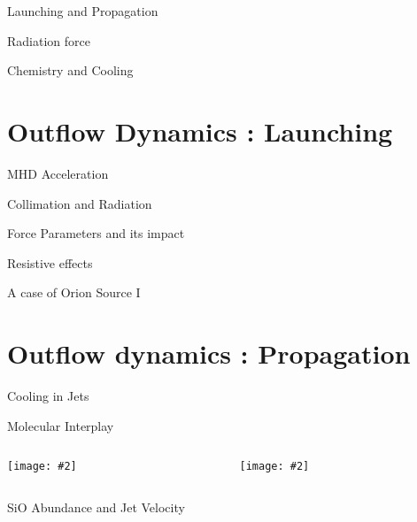 \documentclass[8pt,xcolor=dvipsnames]{beamer}
\newcommand{\figpath}{./NEWFIGS/}
\newcommand{\spic}[2]{\texttt{[image: \#2]}}
\begin{document}
\begin{frame}{Launching and Propagation}
\end{frame}

\begin{frame}{Radiation force}
\end{frame}

\begin{frame}{Chemistry and Cooling}
\end{frame}

\section{Outflow Dynamics : Launching}
\begin{frame}{MHD Acceleration}
\end{frame}

\begin{frame}{Collimation and Radiation}
\end{frame}

\begin{frame}{Force Parameters and its impact}
\end{frame}

\begin{frame}{Resistive effects}
\end{frame}

\begin{frame}{A case of Orion Source I}
\end{frame}

\section{Outflow dynamics : Propagation}
\begin{frame}{Cooling in Jets}
\end{frame}
\begin{frame}{Molecular Interplay}
\begin{columns}
\begin{column}{0.4\textwidth}
\spic{0.2}{\figpath/pfig6.pdf}
\end{column}
\hfill
\begin{column}{0.6\textwidth}
\spic{0.2}{\figpath/pfig7.pdf}
\end{column}
\end{columns}
\end{frame}

\begin{frame}{SiO Abundance and Jet Velocity}
\end{frame}
\end{document}
